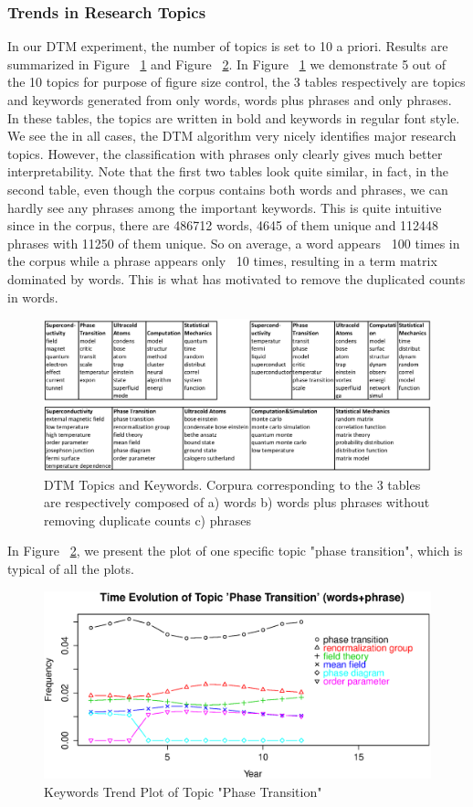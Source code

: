 \documentclass[DIV=calc, paper=letter, fontsize=10pt, twocolumn]{scrartcl}	 %
\begin{document}
\subsubsection*{Trends in Research Topics}
In our DTM experiment, the number of topics is set to 10 a priori. Results are summarized in Figure ~\ref{fig: DTM_table_unweight} and Figure ~\ref{fig: PhaseTrans_wp}. In Figure ~\ref{fig: DTM_table_unweight} we demonstrate 5 out of the 10 topics for purpose of figure size control, the 3 tables respectively are topics and keywords generated from only words, words plus phrases and only phrases. In these tables, the topics are written in bold and keywords in regular font style. We see the in all cases, the DTM algorithm very nicely identifies major research topics. However, the classification with phrases only clearly gives much better interpretability. Note that the first two tables look quite similar, in fact, in the second table, even though the corpus contains both words and phrases, we can hardly see any phrases among the important keywords. This is quite intuitive since in the corpus, there are 486712 words, 4645 of them unique and 112448 phrases with 11250 of them unique. So on average, a word appears ~100 times in the corpus while a phrase appears only ~10 times, resulting in a term matrix dominated by words. This is what has motivated to remove the duplicated counts in words.
\begin{figure}[!ht]
  \includegraphics[scale = 0.45]{dtm10_unweight.eps}
  \caption{DTM Topics and Keywords. \rm{ Corpura corresponding to the 3 tables are respectively composed of a) words b) words plus phrases without removing duplicate counts c) phrases}}
  \label{fig: DTM_table_unweight}
\end{figure}
In Figure ~\ref{fig: PhaseTrans_wp}, we present the plot of one specific topic "phase transition", which is typical of all the plots.
\begin{figure}[!ht]
  \includegraphics[scale = 0.365]{PhaseTrans(w_p).eps}
  \caption{Keywords Trend Plot of Topic "Phase Transition"}
  \label{fig: PhaseTrans_wp}
\end{figure}
\end{document}
